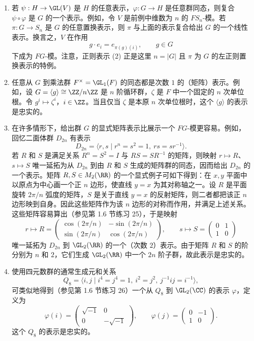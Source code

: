 \begin{enumerate}[label=(\arabic*)]
  \item 若 $\psi:H\to\GL(V)$ 是 $H$ 的任意表示，$\varphi:G\to H$ 是任意群同态，则复合 $\psi\circ\varphi$ 是 $G$ 的一个表示。例如，令 $V$ 是前例中维数为 $n$ 的 $FS_n$-模。若 $\pi:G\to S_n$ 是 $G$ 的任意置换表示，则 $\pi$ 与上面的表示复合给出 $G$ 的一个线性表示。换言之，$V$ 在作用
  \[
    g\cdot e_i=e_{\pi(g)(i)},\qquad g\in G
  \]
  下成为 $FG$-模。注意，正则表示 (2) 正是这里 $n=|G|$ 且 $\pi$ 为 $G$ 的左正则置换表示的特例。

  \item 任意从 $G$ 到乘法群 $F^\times=\GL_1(F)$ 的同态都是次数 $1$ 的（矩阵）表示。例如，设 $G=\langle g\rangle\cong\ZZ/n\ZZ$ 是 $n$ 阶循环群，$\zeta$ 是 $F$ 中一个固定的 $n$ 次单位根。令 $g^i\mapsto\zeta^i$，$i\in\ZZ$。当且仅当 $\zeta$ 是本原 $n$ 次单位根时，这个 $\langle g\rangle$ 的表示是忠实的。

  \item 在许多情形下，给出群 $G$ 的显式矩阵表示比展示一个 $FG$-模更容易。例如，回忆二面体群 $D_{2n}$ 有表示
  \[
    D_{2n}=\langle r,s\mid r^n=s^2=1,
    \ rs=sr^{-1}\rangle.
  \]
  若 $R$ 和 $S$ 是满足关系 $R^n=S^2=I$ 与 $RS=SR^{-1}$ 的矩阵，则映射 $r\mapsto R$、$s\mapsto S$ 唯一延拓为从 $D_{2n}$ 到由 $R$ 和 $S$ 生成的矩阵群的同态，因而给出 $D_{2n}$ 的一个表示。矩阵 $R,S\in M_2(\RR)$ 的一个显式例子可如下得到：在 $x,y$ 平面中以原点为中心画一个正 $n$ 边形，使直线 $y=x$ 为其对称轴之一。设 $R$ 是平面旋转 $2\pi/n$ 弧度的矩阵，$S$ 是关于直线 $y=x$ 的反射矩阵，则二者都把该正 $n$ 边形映到自身。因此这些矩阵作为该 $n$ 边形的对称而作用，并满足上述关系。这些矩阵容易算出（参见第 1.6 节练习 25），于是映射
  \[
    r\mapsto R=\begin{pmatrix}
    \cos(2\pi/n)&-\sin(2\pi/n)\\
    \sin(2\pi/n)&\cos(2\pi/n)
    \end{pmatrix},\qquad
    s\mapsto S=\begin{pmatrix}0&1\\1&0\end{pmatrix}
  \]
  唯一延拓为 $D_{2n}$ 到 $\GL_2(\RR)$ 的一个（次数 $2$）表示。由于矩阵 $R$ 和 $S$ 的阶分别为 $n$ 和 $2$，它们生成 $\GL_2(\RR)$ 中一个 $2n$ 阶子群，故此表示是忠实的。

  \item 使用四元数群的通常生成元和关系
  \[
    Q_8=\langle i,j\mid i^4=j^4=1,
    \ i^2=j^2,
    \ j^{-1}ij=i^{-1}\rangle,
  \]
  可类似地得到（参见第 1.6 节练习 26）一个从 $Q_8$ 到 $\GL_2(\CC)$ 的表示 $\varphi$，定义为
  \[
    \varphi(i)=\begin{pmatrix}\sqrt{-1}&0\\0&-\sqrt{-1}\end{pmatrix},
    \qquad
    \varphi(j)=\begin{pmatrix}0&-1\\1&0\end{pmatrix}.
  \]
  这个 $Q_8$ 的表示是忠实的。


\end{enumerate}
